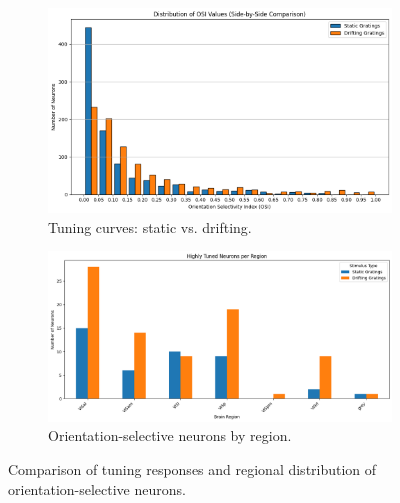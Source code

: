 \documentclass[10pt,twocolumn]{article}
\begin{document}
\begin{figure}[H]
  \centering
  \begin{subfigure}[b]{0.48\linewidth}
    \centering
    \includegraphics[width=\linewidth]{report_images/tuning_curves_comparison.png}
    \caption{Tuning curves: static vs. drifting.}
    \label{fig:tuning_comparison}
  \end{subfigure}
  \hfill
  \begin{subfigure}[b]{0.48\linewidth}
    \centering
    \includegraphics[width=\linewidth]{report_images/tuned_neurons_region.png}
    \caption{Orientation-selective neurons by region.}
    \label{fig:tuned_regions}
  \end{subfigure}
  \caption{Comparison of tuning responses and regional distribution of orientation-selective neurons.}
  \label{fig:tuning_summary}
\end{figure}
\end{document}

